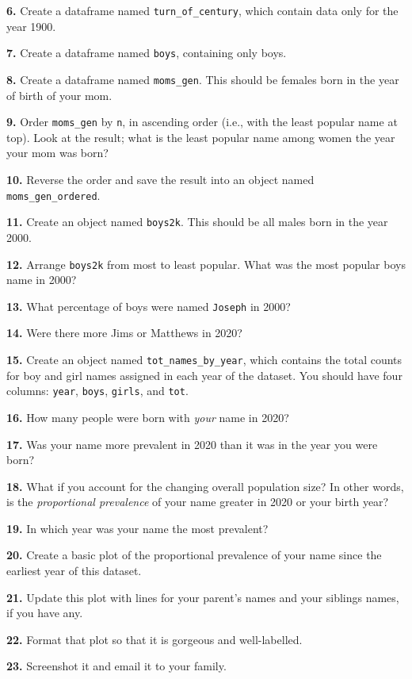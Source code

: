 \documentclass[
]{book}
\begin{document}
\textbf{6.} Create a dataframe named \texttt{turn\_of\_century}, which contain data only for the year 1900.

\textbf{7.} Create a dataframe named \texttt{boys}, containing only boys.

\textbf{8.} Create a dataframe named \texttt{moms\_gen}. This should be females born in the year of birth of your mom.

\textbf{9.} Order \texttt{moms\_gen} by \texttt{n}, in ascending order (i.e., with the least popular name at top). Look at the result; what is the least popular name among women the year your mom was born?

\textbf{10.} Reverse the order and save the result into an object named \texttt{moms\_gen\_ordered}.

\textbf{11.} Create an object named \texttt{boys2k}. This should be all males born in the year 2000.

\textbf{12.} Arrange \texttt{boys2k} from most to least popular. What was the most popular boys name in 2000?

\textbf{13.} What percentage of boys were named \texttt{Joseph} in 2000?

\textbf{14.} Were there more Jims or Matthews in 2020?

\textbf{15.} Create an object named \texttt{tot\_names\_by\_year}, which contains the total counts for boy and girl names assigned in each year of the dataset. You should have four columns: \texttt{year}, \texttt{boys}, \texttt{girls}, and \texttt{tot}.

\textbf{16.} How many people were born with \emph{your} name in 2020?

\textbf{17.} Was your name more prevalent in 2020 than it was in the year you were born?

\textbf{18.} What if you account for the changing overall population size? In other words, is the \emph{proportional prevalence} of your name greater in 2020 or your birth year?

\textbf{19.} In which year was your name the most prevalent?

\textbf{20.} Create a basic plot of the proportional prevalence of your name since the earliest year of this dataset.

\textbf{21.} Update this plot with lines for your parent's names and your siblings names, if you have any.

\textbf{22.} Format that plot so that it is gorgeous and well-labelled.

\textbf{23.} Screenshot it and email it to your family.
\end{document}
